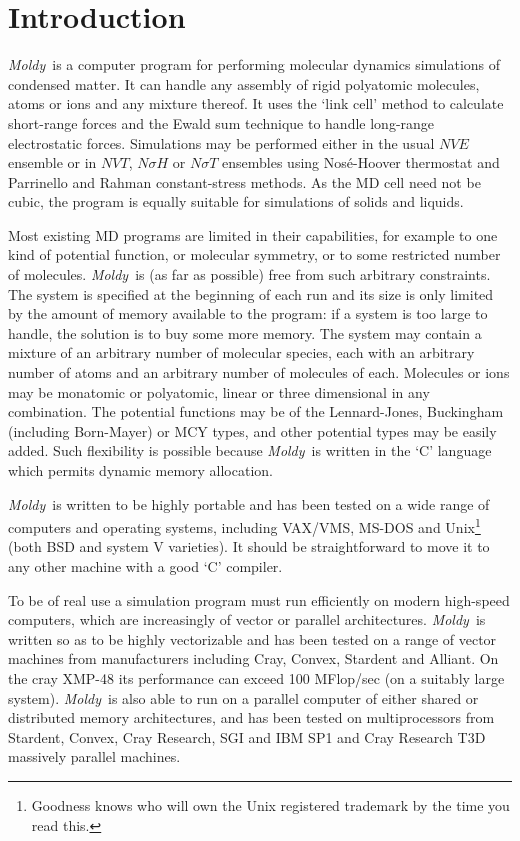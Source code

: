 \documentclass[a4paper,twoside]{report}
\newcommand{\moldy}{\emph{Moldy}}
\begin{document}
\chapter{Introduction}   %

\moldy\ is a computer program for performing molecular dynamics
simulations of condensed matter.  It can handle any assembly of rigid
polyatomic molecules, atoms or ions and any mixture thereof. It uses
the `link cell' method to calculate short-range forces and the Ewald
sum technique to handle long-range electrostatic forces.  Simulations
may be performed either in the usual $NVE$ ensemble or in $NVT$,
$N\sigma H$ or $N\sigma T$ ensembles using Nos{\'e}-Hoover thermostat and
Parrinello and Rahman constant-stress methods. As the MD cell need not
be cubic, the program is equally suitable for simulations of solids
and liquids.

Most existing MD programs are limited in their capabilities, for
example to one kind of potential function, or molecular symmetry, or
to some restricted number of molecules.  \moldy\  is (as far as
possible) free from such arbitrary constraints.  The system is
specified at the beginning of each run and its size is only limited by
the amount of memory available to the program: if a system is too
large to handle, the solution is to buy some more memory.  The system
may contain a mixture of an arbitrary number of molecular species,
each with an arbitrary number of atoms and an arbitrary number of
molecules of each. Molecules or ions may be monatomic or polyatomic,
linear or three dimensional in any combination.  The potential
functions may be of the Lennard-Jones, Buckingham (including
Born-Mayer) or MCY types, and other potential types may be easily
added.  Such flexibility is possible because \moldy\  is written in the
`C' language which permits dynamic memory allocation.

\moldy\  is written to be highly portable and has been tested on a wide
range of computers and operating systems, including VAX/VMS,
MS-DOS and Unix\footnote{Goodness knows who will own the Unix
registered trademark by the time you read this.}  (both BSD and system V
varieties).  It should be straightforward to move it to any other
machine with a good `C' compiler.

To be of real use a simulation  program must run efficiently on modern
high-speed computers, which  are  increasingly of vector   or parallel
architectures.  \moldy\  is written so  as to be highly vectorizable and
has been  tested on a   range of  vector machines  from  manufacturers
including Cray, Convex, Stardent and  Alliant.  On the cray XMP-48 its
performance can exceed 100 MFlop/sec (on a suitably large  system).
\moldy\ is also able to run on a parallel computer of either shared or
distributed memory architectures, and has been tested on
multiprocessors from Stardent, Convex, Cray Research, SGI and IBM SP1
and Cray Research T3D massively parallel machines.
\end{document}
